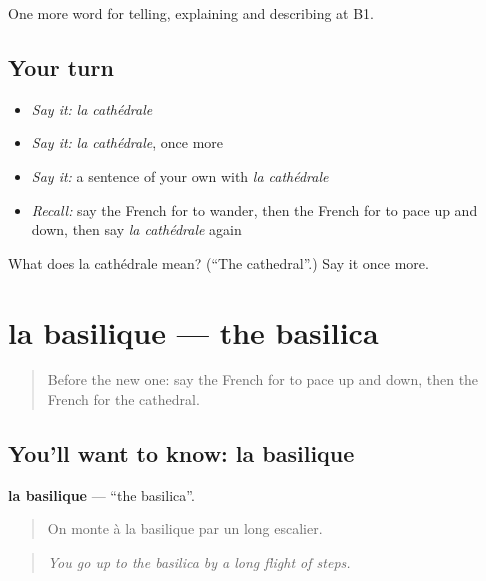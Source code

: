 \begin{grammarlens}[title={What you've built}]
One more word for telling, explaining and describing at B1.
\end{grammarlens}

\subsection*{Your turn}
\begin{itemize}
\raggedright
  \item \emph{Say it:} \emph{la cathédrale}
  \item \emph{Say it:} \emph{la cathédrale}, once more
  \item \emph{Say it:} a sentence of your own with \emph{la cathédrale}
  \item \emph{Recall:} say the French for to wander, then the French for to pace up and down, then say \emph{la cathédrale} again
\end{itemize}

\begin{tcolorbox}[breakable,colback=teal!4,colframe=teal!35!black,title={Before you move on}]
What does la cathédrale mean? (\textquotedblleft{}The cathedral\textquotedblright{}.) Say it once more.
\end{tcolorbox}
\section[la basilique]{la basilique — the basilica}

\label{lesson:FR-C439-basilique}



\begin{quote}
Before the new one: say the French for to pace up and down, then the French for the cathedral.
\end{quote}

\subsection*{You'll want to know: la basilique}
\textbf{la basilique} — \textquotedblleft{}the basilica\textquotedblright{}.

\begin{quote}
On monte à la basilique par un long escalier.
\end{quote}

\begin{quote}
\emph{You go up to the basilica by a long flight of steps.}
\end{quote}

